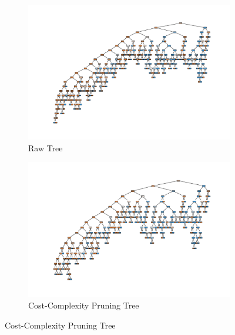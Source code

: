 \documentclass[12pt]{article}
\begin{document}
\begin{figure}[htbp]
    \centering
    \begin{subfigure}{0.45\textwidth}
        \centering
        \includegraphics[width=\linewidth]{figures/Reduced Error Pruning/raw_tree.png}  %
        \caption{Raw Tree}
        \label{fig:method1}
    \end{subfigure}
    \hfill
    \begin{subfigure}{0.45\textwidth}
        \centering
        \includegraphics[width=\linewidth]{figures/Reduced Error Pruning/ccp tree.png}  %
        \caption{Cost-Complexity Pruning Tree}
        \label{fig:method2}
    \end{subfigure}
    

\end{figure}
\end{document}
